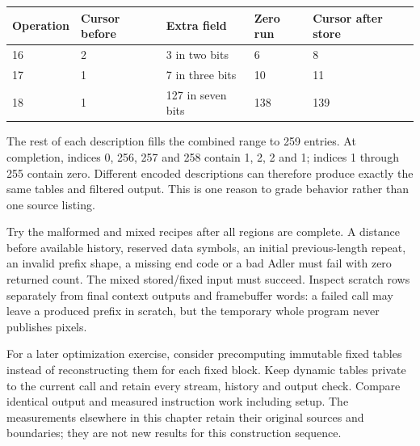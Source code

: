 \begin{longtable}{p{27mm}p{25mm}p{27mm}p{24mm}p{36mm}}
  \toprule Operation & Cursor before & Extra field       & Zero run & Cursor after store \\\midrule
  16                 & 2             & 3 in two bits     & 6        & 8                  \\
  17                 & 1             & 7 in three bits   & 10       & 11                 \\
  18                 & 1             & 127 in seven bits & 138      & 139                \\\bottomrule
\end{longtable}
The rest of each description fills the combined range to 259 entries. At completion,
indices 0, 256, 257 and 258 contain 1, 2, 2 and 1; indices 1 through 255 contain zero.
Different encoded descriptions can therefore produce exactly the same tables and
filtered output. This is one reason to grade behavior rather than one source listing.

Try the malformed and mixed recipes after all regions are complete. A distance before
available history, reserved data symbols, an initial previous-length repeat, an invalid
prefix shape, a missing end code or a bad Adler must fail with zero returned count.
The mixed stored/fixed input must succeed. Inspect scratch rows separately from final
context outputs and framebuffer words: a failed call may leave a produced prefix in
scratch, but the temporary whole program never publishes pixels.

For a later optimization exercise, consider precomputing immutable fixed tables instead
of reconstructing them for each fixed block. Keep dynamic tables private to the current
call and retain every stream, history and output check. Compare identical output and
measured instruction work including setup. The measurements elsewhere in this chapter
retain their original sources and boundaries; they are not new results for this
construction sequence.
